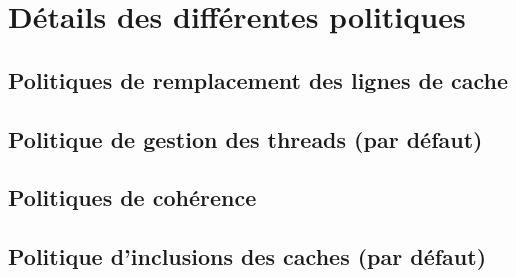 
\section{Détails des différentes politiques}

\subsection{Politiques de remplacement des lignes de cache}

\subsection{Politique de gestion des threads (par défaut)}

\subsection{Politiques de cohérence}

\subsection{Politique d'inclusions des caches (par défaut)}




